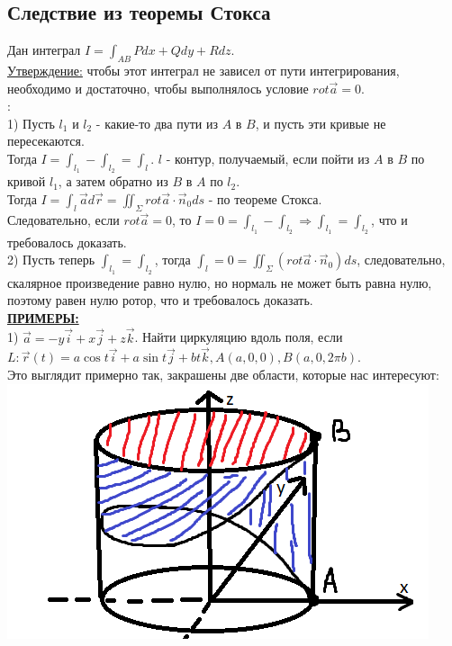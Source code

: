 \documentclass[12pt]{article}
\begin{document}
\subsection{Следствие из теоремы Стокса}
Дан интеграл $I = \int_{AB} Pdx + Qdy + Rdz$. \\
\uline{Утверждение:} чтобы этот интеграл не зависел от пути интегрирования, необходимо и достаточно, чтобы выполнялось условие  $rot \overrightarrow{a} = 0$.\\
:\\
1) Пусть $l_1$ и $l_2$ - какие-то два пути из $A$ в $B$, и пусть эти кривые не пересекаются.\\
Тогда $I = \int_{l_1} - \int_{l_2} = \int_l$. $l$ - контур, получаемый, если пойти из $A$ в $B$ по кривой $l_1$, а затем обратно из $B$ в $A$ по $l_2$.\\
Тогда $I = \int_l \overrightarrow{a} d \overrightarrow{r} = \iint_{\Sigma} rot \overrightarrow{a} \cdot \overrightarrow{n}_0 ds$ - по теореме Стокса.\\
Следовательно, если $rot \overrightarrow{a} = 0$, то $I = 0 = \int_{l_1} - \int_{l_2} \Rightarrow \int_{l_1} = \int_{l_2}$, что и требовалось доказать.\\
2) Пусть теперь $\int_{l_1} = \int_{l_2}$, тогда $\int_l = 0 = \iint_{\Sigma} (rot \overrightarrow{a} \cdot \overrightarrow{n}_0) ds$, следовательно, скалярное произведение равно нулю, но нормаль не может быть равна нулю, поэтому равен нулю ротор, что и требовалось доказать.\\
\uline{\textbf{ПРИМЕРЫ:}}\\
1) $\overrightarrow{a} = -y \overrightarrow{i} + x \overrightarrow{j} + z \overrightarrow{k}$. Найти циркуляцию вдоль поля, если\\
$L: \overrightarrow{r}(t) = a \cos t \overrightarrow{i} + a \sin t \overrightarrow{j} + b t \overrightarrow{k}, A(a,0,0), B(a,0,2 \pi b)$.\\
Это выглядит примерно так, закрашены две области, которые нас интересуют:\\
\includegraphics{stokesExample1}\\
\end{document}
